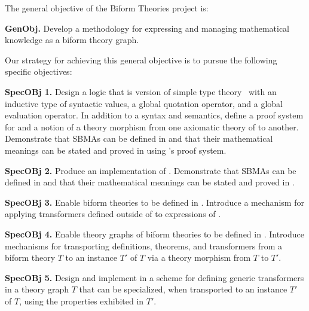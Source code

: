 \documentclass[fleqn]{llncs}
\begin{document}
The general objective of the Biform Theories project is:

\bi

  \item[] \textbf{GenObj.} Develop a methodology for expressing and
    managing mathematical knowledge as a biform theory graph.

\ei

\noindent
Our strategy for achieving this general objective is to pursue the
following specific objectives:

\bi

  \item[]\textbf{SpecOBj 1.} Design a logic  that is
    version of simple type theory~\cite{Farmer08} with an inductive
    type of syntactic values, a global quotation operator, and a
    global evaluation operator.  In addition to a syntax and
    semantics, define a proof system for  and a notion of a
    theory morphism from one axiomatic theory of  to
    another.  Demonstrate that SBMAs can be defined in  and
    that their mathematical meanings can be stated and proved in using
    's proof system.

\medskip

  \item[]\textbf{SpecOBj 2.} Produce an implementation  of
    .  Demonstrate that SBMAs can be defined in
     and that their mathematical meanings can be stated
    and proved in .

\medskip

  \item[]\textbf{SpecOBj 3.} Enable biform theories to be defined in
    .  Introduce a mechanism for applying transformers
    defined outside of  to expressions of .

\medskip

  \item[]\textbf{SpecOBj 4.} Enable theory graphs of biform theories
    to be defined in .  Introduce mechanisms for
    transporting definitions, theorems, and transformers from a biform
    theory $T$ to an instance $T'$ of $T$ via a theory morphism from
    $T$ to $T'$.

\medskip

  \item[]\textbf{SpecOBj 5.} Design and implement in  a
    scheme for defining generic transformers in a theory graph $T$
    that can be specialized, when transported to an instance $T'$ of
    $T$, using the properties exhibited in $T'$.
\end{document}
